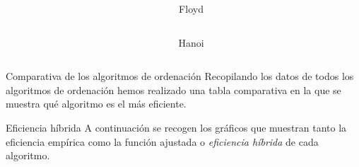 \documentclass[spanish]{beamer}
\begin{document}
\begin{frame}
	\begin{center}
		
	\end{center}
\end{frame}

\begin{frame}
	\begin{columns}[c] %
		\begin{column}{.6\textwidth}
		\end{column}%
		
		\hfill%
		
		\begin{column}{.3\textwidth}
			Floyd
		\end{column}%
		
	\end{columns}
\end{frame}

\begin{frame}
	\begin{columns}[c] %
		\begin{column}{.6\textwidth}
		\end{column}%
		
		\hfill%
		
		\begin{column}{.3\textwidth}
			Hanoi
		\end{column}%
		
	\end{columns}
\end{frame}

\begin{frame}{Comparativa de los algoritmos de ordenación}
	Recopilando los datos de todos los algoritmos de ordenación hemos realizado una tabla comparativa en la que se muestra qué algoritmo es el más eficiente.
\end{frame}

\begin{frame}
	\begin{center}
		\resizebox*{11cm}{!}{
				
			}
		
	\end{center}
\end{frame}

\begin{frame}{Eficiencia híbrida}
	A continuación se recogen los gráficos que muestran tanto la eficiencia empírica como la función ajustada o \textit{eficiencia híbrida} de cada algoritmo.	
\end{frame}
\end{document}
